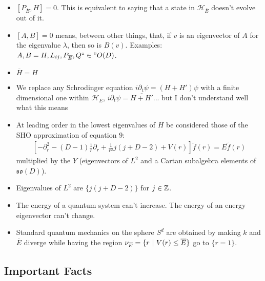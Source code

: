 \documentclass{article}
\newcommand{\cut}[1]{\overline{#1}}
\begin{document}
    \begin{itemize}

    \item $[P_{\cut E}, H] = 0$. This is equivalent to saying that a state in $\mathcal H_{\cut E}$ doesn't evolve out of it.
    
    \item $[A, B] = 0$ means, between other things, that, if $v$ is an eigenvector of $A$ for the eigenvalue $\lambda$, then so is $B(v)$. Examples: $A, B = H, L_{ij}, P_{\cut E}, Q ``\in" O(D)$.
    
    \item $\cut H = H$
    
    \item We replace any Schrodinger equation $i \partial_t \psi = (H + H')\psi$ with a finite dimensional one within $\mathcal H_{\cut E}$, $i \partial_t \psi = \cut{H + H'}$... but I don't understand well what this means
    
    \item At leading order in  the lowest eigenvalues of $H$ be considered those of the SHO approximation of equation $9$:
    \begin{align*}
        \left[-\partial_r^2 - (D-1) \frac{1}{r} \partial_r + \frac{1}{r^2} j(j+D-2) + V(r)\right] \tilde f(r) = E \tilde f(r)
    \end{align*} multiplied by the $Y$ (eigenvectors of $L^2$ and a Cartan subalgebra elements of $\mathfrak{so}(D)$).
    
    \item Eigenvalues of $L^2$ are $\{j(j+D-2)\}$ for $j \in \mathbb{Z}$.
    
    \item The energy of a quantum system can't increase. The energy of an energy eigenvector can't change.
    
    \item Standard quantum mechanics on the sphere $S^d$ are obtained by making $k$ and $\cut E$ diverge while having the region $\nu_{\cut E} = \{r \st V(r) \leq \cut E\}$ go to $\{r = 1\}$.
    
    \end{itemize}

\subsection*{Important Facts}
\end{document}
